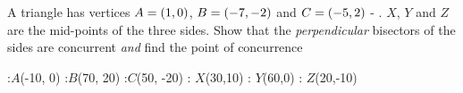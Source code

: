 
\gcalcexpr[0]{\mab}{-(\vbthree - \vbone)/(\vbfour - \vbtwo)}
\gcalcexpr[2]{\mbc}{-(\vbfive - \vbthree)/(\vbsix - \vbfour) }
\gcalcexpr[0]{\mca}{-(\vbone - \vbfive)/(\vbtwo - \vbsix)} 

\gcalcexpr[0]{\cone}{\myone - (\mab * \mxone)}
\gcalcexpr[0]{\ctwo}{\mytwo - (\mbc * \mxtwo)}
\gcalcexpr[0]{\cthree}{\mythree - (\mca * \mxthree)}

\question A triangle has vertices $A = (1, 0)$, $B = (-7, -2)$ and 
$C = (-5, 2)$ - \asif. $X$, $Y$ and $Z$ are the mid-points of the three sides.
Show that the \textit{perpendicular} bisectors of the sides are concurrent \textit{and}
find the point of concurrence


\begin{marginfigure}
    :$A$(-10, 0)
    :$B$(70, 20)
    :$C$(50, -20)
    : $X$(30,10)
    : $Y$(60,0)
    : $Z$(20,-10)
  \figdrawbegin{}
    \figdrawline [10, 20]
    \figdrawline [20, 30]
    \figdrawline [30, 10]
  \figdrawend
  \centerline{\box\figBoxA}
\end{marginfigure}

\watchout

